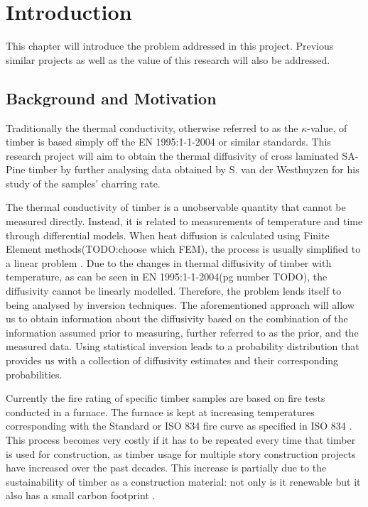 \chapter{Introduction} \label{introduction}
This chapter will introduce the problem addressed in this project. 
Previous similar projects as well as the value of this research will also be addressed.

\section{Background and Motivation}

Traditionally the thermal conductivity, otherwise referred to as the $\kappa$-value, of timber is based simply off the EN 1995:1-1-2004 or similar standards.
This research project will aim to obtain the thermal diffusivity of cross laminated SA-Pine timber by further analysing data obtained by S. van der Westhuyzen for his study of the samples' charring rate.

The thermal conductivity of timber is a unobservable quantity that cannot be measured directly. 
Instead, it is related to measurements of temperature and time through differential models. 
When heat diffusion is calculated using Finite Element methods(TODO:choose which FEM), the process is usually simplified to a linear problem \citep{Fish:2007}. 
Due to the changes in thermal diffusivity of timber with temperature, as can be seen in EN 1995:1-1-2004(pg number TODO), the diffusivity cannot be linearly modelled. 
Therefore, the problem lends itself to being analysed by inversion techniques. 
The aforementioned approach will allow us to obtain information about the diffusivity based on the combination of the information assumed prior to measuring, further referred to as the prior, and the measured data. 
Using statistical inversion leads to a probability distribution that provides us with a collection of diffusivity estimates and their corresponding probabilities.

Currently the fire rating of specific timber samples are based on fire tests conducted in a furnace. 
The furnace is kept at increasing temperatures corresponding with the Standard or ISO 834 fire curve as specified in ISO 834 \citet{ISO:1999}.
This process becomes very costly if it has to be repeated every time that timber is used for construction, as timber usage for multiple story construction projects have increased over the past decades. 
This increase is partially due to the sustainability of timber as a construction material: not only is it renewable but it also has a small carbon footprint \citep{Salvadori:2017}.



